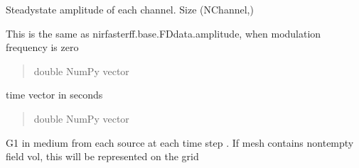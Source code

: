\documentclass[letterpaper,10pt,english]{sphinxmanual}
\begin{document}
\begin{fulllineitems}
\begin{fulllineitems}
\begin{quote}
\begin{description}
\end{description}\end{quote}

\end{fulllineitems}


\begin{fulllineitems}
\label{\detokenize{_autosummary/nirfasterff.base.data.DCSdata:nirfasterff.base.data.DCSdata.amplitude}}
\pysigstartsignatures
\pysigline
{}
\pysigstopsignatures
\sphinxAtStartPar
Steady\sphinxhyphen{}state amplitude of each channel. Size (NChannel,)

\sphinxAtStartPar
This is the same as nirfasterff.base.FDdata.amplitude, when modulation frequency is zero
\begin{quote}\begin{description}
\sphinxAtStartPar
double NumPy vector

\end{description}\end{quote}

\end{fulllineitems}


\begin{fulllineitems}
\label{\detokenize{_autosummary/nirfasterff.base.data.DCSdata:nirfasterff.base.data.DCSdata.tau_DCS}}
\pysigstartsignatures
\pysigline
{}
\pysigstopsignatures
\sphinxAtStartPar
time vector in seconds
\begin{quote}\begin{description}
\sphinxAtStartPar
double NumPy vector

\end{description}\end{quote}

\end{fulllineitems}


\begin{fulllineitems}
\label{\detokenize{_autosummary/nirfasterff.base.data.DCSdata:nirfasterff.base.data.DCSdata.phi_DCS}}
\pysigstartsignatures
\pysigline
{}
\pysigstopsignatures
\sphinxAtStartPar
G1 in medium from each source at each time step . If mesh contains non\sphinxhyphen{}tempty field vol, this will be represented on the grid


\end{fulllineitems}
\end{fulllineitems}
\end{document}
